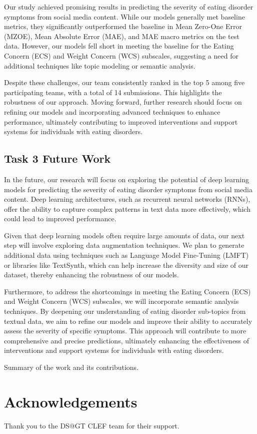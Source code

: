 \documentclass[]{style/ceurart}
\begin{document}
Our study achieved promising results in predicting the severity of eating disorder symptoms from social media content. While our models generally met baseline metrics, they significantly outperformed the baseline in Mean Zero-One Error (MZOE), Mean Absolute Error (MAE), and MAE macro metrics on the test data. However, our models fell short in meeting the baseline for the Eating Concern (ECS) and Weight Concern (WCS) subscales, suggesting a need for additional techniques like topic modeling or semantic analysis.

Despite these challenges, our team consistently ranked in the top 5 among five participating teams, with a total of 14 submissions. This highlights the robustness of our approach. Moving forward, further research should focus on refining our models and incorporating advanced techniques to enhance performance, ultimately contributing to improved interventions and support systems for individuals with eating disorders.

\subsection{Task 3 Future Work}

In the future, our research will focus on exploring the potential of deep learning models for predicting the severity of eating disorder symptoms from social media content. Deep learning architectures, such as recurrent neural networks (RNNs), offer the ability to capture complex patterns in text data more effectively, which could lead to improved performance.

Given that deep learning models often require large amounts of data, our next step will involve exploring data augmentation techniques. We plan to generate additional data using techniques such as Language Model Fine-Tuning (LMFT) or libraries like TextSynth, which can help increase the diversity and size of our dataset, thereby enhancing the robustness of our models.

Furthermore, to address the shortcomings in meeting the Eating Concern (ECS) and Weight Concern (WCS) subscales, we will incorporate semantic analysis techniques. By deepening our understanding of eating disorder sub-topics from textual data, we aim to refine our models and improve their ability to accurately assess the severity of specific symptoms. This approach will contribute to more comprehensive and precise predictions, ultimately enhancing the effectiveness of interventions and support systems for individuals with eating disorders.



Summary of the work and its contributions.

\section*{Acknowledgements}

Thank you to the DS@GT CLEF team for their support.



\end{document}
